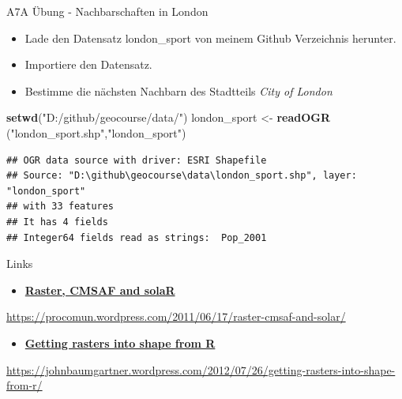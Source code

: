 \documentclass[ignorenonframetext,]{beamer}
\newenvironment{Shaded}{\begin{snugshade}}{\end{snugshade}}
\newcommand{\KeywordTok}[1]{\textcolor[rgb]{0.26,0.66,0.93}{\textbf{#1}}}
\newcommand{\NormalTok}[1]{\textcolor[rgb]{0.74,0.68,0.62}{#1}}
\newcommand{\StringTok}[1]{\textcolor[rgb]{0.02,0.61,0.04}{#1}}
\providecommand{\tightlist}{%
  \setlength{\itemsep}{0pt}\setlength{\parskip}{0pt}}
\begin{document}
\begin{frame}[fragile]{A7A Übung - Nachbarschaften in London}
\protect\hypertarget{a7a-ubung---nachbarschaften-in-london}{}

\begin{itemize}
\tightlist
\item
  Lade den Datensatz london\_sport von meinem Github Verzeichnis
  herunter.
\item
  Importiere den Datensatz.
\item
  Bestimme die nächsten Nachbarn des Stadtteils \emph{City of London}
\end{itemize}

\begin{Shaded}
\begin{Highlighting}[]
\KeywordTok{setwd}\NormalTok{(}\StringTok{"D:/github/geocourse/data/"}\NormalTok{)}
\NormalTok{london_sport <-}\StringTok{ }\KeywordTok{readOGR}\NormalTok{ (}\StringTok{"london_sport.shp"}\NormalTok{,}\StringTok{"london_sport"}\NormalTok{)}
\end{Highlighting}
\end{Shaded}

\begin{verbatim}
## OGR data source with driver: ESRI Shapefile 
## Source: "D:\github\geocourse\data\london_sport.shp", layer: "london_sport"
## with 33 features
## It has 4 fields
## Integer64 fields read as strings:  Pop_2001
\end{verbatim}

\end{frame}

\begin{frame}{Links}
\protect\hypertarget{links}{}

\begin{itemize}
\tightlist
\item
  \href{https://procomun.wordpress.com/2011/06/17/raster-cmsaf-and-solar/}{\textbf{Raster,
  CMSAF and solaR}}
\end{itemize}

\url{https://procomun.wordpress.com/2011/06/17/raster-cmsaf-and-solar/}

\begin{itemize}
\tightlist
\item
  \href{https://johnbaumgartner.wordpress.com/2012/07/26/getting-rasters-into-shape-from-r/}{\textbf{Getting
  rasters into shape from R}}
\end{itemize}

\url{https://johnbaumgartner.wordpress.com/2012/07/26/getting-rasters-into-shape-from-r/}

\end{frame}
\end{document}
